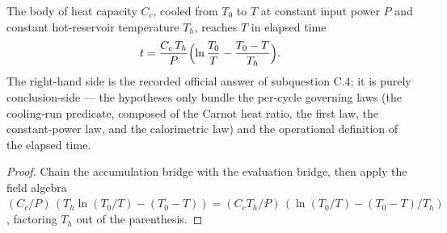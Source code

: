 \begin{theorem}
\label{thm:IPhO2026Problems_problem_IPhO_2026_3_C_4:c4_elapsed_time}
The body of heat capacity $C_c$, cooled from $T_0$ to $T$ at constant
input power $P$ and constant hot-reservoir temperature $T_h$, reaches
$T$ in elapsed time
\[
t = \frac{C_c\,T_h}{P}\Bigl(\ln\frac{T_0}{T} - \frac{T_0 - T}{T_h}\Bigr).
\]
The right-hand side is the recorded official answer of subquestion
C.4; it is purely conclusion-side --- the hypotheses only bundle the
per-cycle governing laws (the cooling-run predicate, composed of the
Carnot heat ratio, the first law, the constant-power law, and the
calorimetric law) and the operational definition of the elapsed time.
\end{theorem}
\begin{proof}
Chain the accumulation bridge with the evaluation bridge, then apply
the field algebra
$(C_c/P)\,(T_h \ln(T_0/T) - (T_0 - T))
= (C_c T_h/P)\,(\ln(T_0/T) - (T_0 - T)/T_h)$,
factoring $T_h$ out of the parenthesis.
\end{proof}
